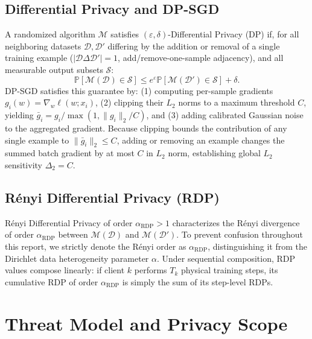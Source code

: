 \documentclass[11pt,a4paper]{article}
\begin{document}
\subsection{Differential Privacy and DP-SGD}
A randomized algorithm $\mathcal{M}$ satisfies $(\varepsilon, \delta)$-Differential Privacy (DP) if, for all neighboring datasets $\mathcal{D}, \mathcal{D}'$ differing by the addition or removal of a single training example ($|\mathcal{D} \Delta \mathcal{D}'| = 1$, add/remove-one-sample adjacency), and all measurable output subsets $\mathcal{S}$:
\begin{equation}
    \mathbb{P}[\mathcal{M}(\mathcal{D}) \in \mathcal{S}] \le e^\varepsilon \mathbb{P}[\mathcal{M}(\mathcal{D}') \in \mathcal{S}] + \delta.
\end{equation}
DP-SGD satisfies this guarantee by: (1) computing per-sample gradients $g_i(w) = \nabla_w \ell(w; x_i)$, (2) clipping their $L_2$ norms to a maximum threshold $C$, yielding $\bar{g}_i = g_i / \max(1, \|g_i\|_2 / C)$, and (3) adding calibrated Gaussian noise to the aggregated gradient. Because clipping bounds the contribution of any single example to $\|\bar{g}_i\|_2 \le C$, adding or removing an example changes the summed batch gradient by at most $C$ in $L_2$ norm, establishing global $L_2$ sensitivity $\Delta_2 = C$.

\subsection{Rényi Differential Privacy (RDP)}
Rényi Differential Privacy of order $\alpha_{\text{RDP}} > 1$ characterizes the Rényi divergence of order $\alpha_{\text{RDP}}$ between $\mathcal{M}(\mathcal{D})$ and $\mathcal{M}(\mathcal{D}')$. To prevent confusion throughout this report, we strictly denote the Rényi order as $\alpha_{\text{RDP}}$, distinguishing it from the Dirichlet data heterogeneity parameter $\alpha$. Under sequential composition, RDP values compose linearly: if client $k$ performs $T_k$ physical training steps, its cumulative RDP of order $\alpha_{\text{RDP}}$ is simply the sum of its step-level RDPs.

\section{Threat Model and Privacy Scope}
\end{document}
